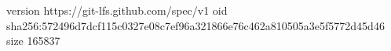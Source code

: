 version https://git-lfs.github.com/spec/v1
oid sha256:572496d7dcf115c0327e08c7ef96a321866e76c462a810505a3e5f5772d45d46
size 165837
